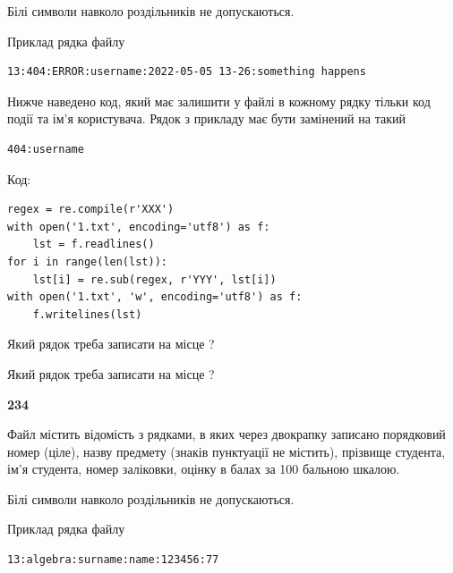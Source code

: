 Білі символи навколо роздільників не допускаються.

Приклад рядка файлу



\begin{verbatim}
13:404:ERROR:username:2022-05-05 13-26:something happens
\end{verbatim}


Нижче наведено код, який має залишити у файлі в кожному рядку тільки код події та ім'я користувача. Рядок з прикладу має бути замінений на такий



\begin{verbatim}
404:username
\end{verbatim}




Код:



\begin{verbatim}
regex = re.compile(r'XXX')
with open('1.txt', encoding='utf8') as f:
    lst = f.readlines()
for i in range(len(lst)):
    lst[i] = re.sub(regex, r'YYY', lst[i])
with open('1.txt', 'w', encoding='utf8') as f:
    f.writelines(lst)
\end{verbatim}







Який рядок треба записати на місце  ?\par
\vspace{5mm}


Який рядок треба записати на місце  ?\par


\newpage

{\begin {center}\textbf{ 234}\end {center}}\par
Файл  містить відомість з рядками, в яких через двокрапку записано поряд\-ковий номер (ціле), назву предмету (знаків пунктуації не містить), прізвище студента, ім'я студента, номер заліковки, оцінку в балах за 100 бальною шкалою.

Білі символи навколо роздільників не допускаються.

Приклад рядка файлу



\begin{verbatim}
13:algebra:surname:name:123456:77
\end{verbatim}


